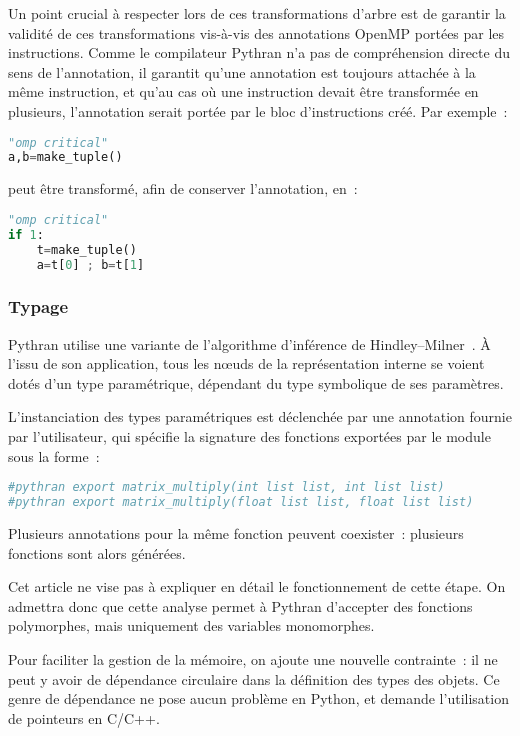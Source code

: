 \documentclass[renpar]{compas2013}
\begin{document}
Un point crucial à respecter lors de ces transformations d'arbre est de
garantir la validité de ces transformations vis-à-vis des annotations
OpenMP portées par les instructions. Comme le compilateur Pythran n'a pas
de compréhension directe du sens de l'annotation, il garantit qu'une
annotation est toujours attachée à la même instruction, et qu'au cas où
une instruction devait être transformée en plusieurs, l'annotation serait
portée par le bloc d'instructions créé. Par exemple~:
%
\begin{lstlisting}[language=python]
"omp critical"
a,b=make_tuple()
\end{lstlisting}
%
\noindent peut être transformé, afin de conserver l'annotation,  en~:
\begin{lstlisting}[language=python]
"omp critical"
if 1:
	t=make_tuple()
	a=t[0] ; b=t[1]
\end{lstlisting}
%

\subsubsection{Typage}

Pythran utilise une variante de l'algorithme d'inférence de
Hindley--Milner~\cite{milner78}. À l'issu de son application, tous les
nœuds de la représentation interne se voient dotés d'un type paramétrique,
dépendant du type symbolique de ses paramètres.

L'instanciation des types paramétriques est déclenchée par une annotation
fournie par l'utilisateur, qui spécifie la signature des fonctions
exportées par le module sous la forme~:
%
\begin{lstlisting}[language=python]
#pythran export matrix_multiply(int list list, int list list)
#pythran export matrix_multiply(float list list, float list list)
\end{lstlisting}
%
Plusieurs annotations pour la même fonction peuvent coexister~: plusieurs
fonctions sont alors générées.

Cet article ne vise pas à expliquer en détail le fonctionnement de cette
étape. On admettra donc que cette analyse permet à Pythran d'accepter des
fonctions polymorphes, mais uniquement des variables monomorphes.

Pour faciliter la gestion de la mémoire, on ajoute une nouvelle
contrainte~: il ne peut y avoir de dépendance circulaire dans la
définition des types des objets. Ce genre de dépendance ne pose aucun
problème en Python, et demande l'utilisation de pointeurs en C/C++.
\end{document}

